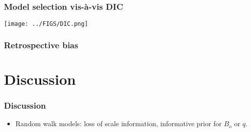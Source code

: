\documentclass{beamer}
\begin{document}
\begin{frame}[t]\frametitle{Model selection vis-\`a-vis DIC}
    
\begin{center}
		\texttt{[image: ../FIGS/DIC.png]} 
    \end{center}

\end{frame}


\begin{frame}[m]\frametitle{Retrospective bias}
\end{frame}




\section{Discussion} %
\label{sec:discussion}

\begin{frame}[t]\frametitle{Discussion}
    
	\begin{itemize}
		\item Random walk models: loss of scale information, informative prior for $B_o$ or $q$.
	\end{itemize}

\end{frame}

%
\end{document}
